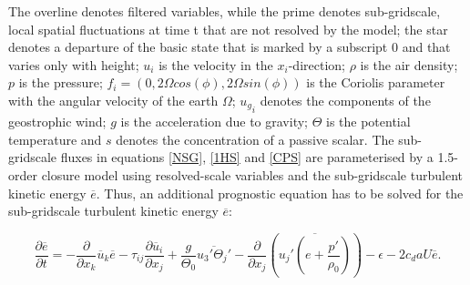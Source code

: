 \documentclass[11pt,a4paper,titlepage]{scrreprt}
\begin{document}
The overline denotes filtered variables, while the prime denotes sub-gridscale, local spatial fluctuations at time t that are not resolved by the model; 
the star denotes a departure of the basic state that is marked by a subscript $0$ and that varies only 
with height; $u_i$ is the velocity in the $x_i$-direction; $\rho$ is the air density; $p$ is the pressure; $f_i=(0,2\Omega cos(\phi),2\Omega sin(\phi))$ 
is the Coriolis parameter with the angular velocity of the earth $\Omega$; ${u_g}_i$ denotes the components of the geostrophic wind; $g$ is the 
acceleration due to gravity; $\Theta$ is the potential temperature and $s$ denotes the concentration of a passive scalar.
The sub-gridscale fluxes in equations \ref{NSG}, \ref{1HS} and \ref{CPS} are parameterised by a 1.5-order closure model using resolved-scale variables 
and the sub-gridscale turbulent kinetic energy $\overline{e}$. Thus, an additional prognostic equation has to be solved for the sub-gridscale turbulent 
kinetic energy $\overline{e}$:     

\begin{equation} \label{TKE}
\frac{\partial \overline e}{\partial t} = - \frac{\partial}{\partial x_k} \overline{u}_k \overline{e} - \tau_{ij} \frac{\partial \overline{u}_i}{\partial x_j} + \frac{g}{\Theta_0} \overline{u_3'\Theta_j'} - \frac{\partial}{\partial x_j} \left ( \overline{u_j' \left ( e + \frac{p'}{\rho_0} \right ) } \right ) - \epsilon - 2 c_d a U \overline{e}.
\end{equation}
\end{document}
